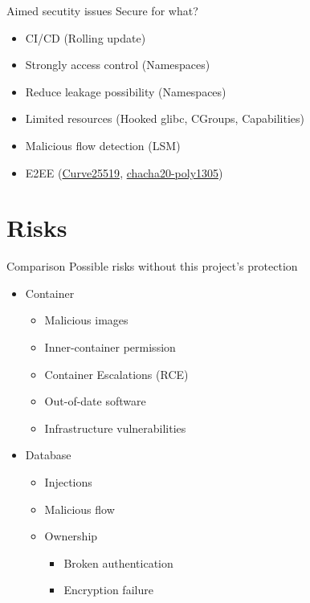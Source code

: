 \documentclass{beamer}
\begin{document}
\begin{CJK*}{UTF8}{bsmi}
  \begin{frame}{Aimed secutity issues}
    Secure for what?
    \begin{itemize}
      \item[\textcolor{dockerColor}{\textbullet}] CI/CD (Rolling update)
      \item[\textcolor{secureColor}{\textbullet}] Strongly access control (Namespaces)
      \item[\textcolor{secureColor}{\textbullet}] Reduce leakage possibility (Namespaces)
      \item[\textcolor{secureColor}{\textbullet}] Limited resources (Hooked glibc, CGroups, Capabilities)
      \item[\textcolor{secureColor}{\textbullet}] Malicious flow detection (LSM)
      \item[\textcolor{secureColor}{\textbullet}] E2EE (\href{https://zh.wikipedia.org/zh-tw/Curve25519}{Curve25519},
            \href{https://zh.wikipedia.org/zh-tw/WireGuard}{chacha20-poly1305})
    \end{itemize}
  \end{frame}

  \section{Risks}
  \begin{frame}{Comparison}
    Possible risks without this project's protection
    \begin{multicols*}{2}
      \begin{itemize}
        \item Container
              \begin{itemize}
                \item Malicious images
                \item Inner-container permission
                \item Container Escalations (RCE)
                \item Out-of-date software
                \item Infrastructure vulnerabilities
              \end{itemize}
      \end{itemize}
      \begin{itemize}
        \item Database
              \begin{itemize}
                \item Injections
                \item Malicious flow
                \item Ownership
                      \begin{itemize}
                        \item Broken authentication
                        \item Encryption failure
                      \end{itemize}
              \end{itemize}
      \end{itemize}
    \end{multicols*}
  \end{frame}


\end{CJK*}
\end{document}
